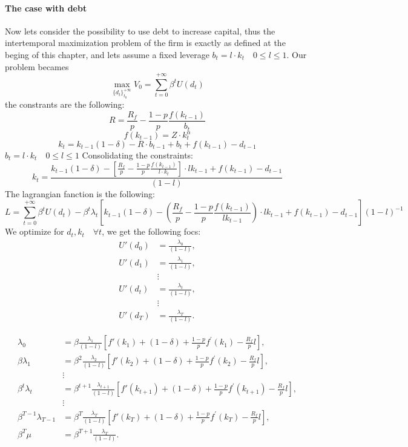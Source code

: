 \documentclass[12pt]{article}
\begin{document}
\paragraph{The case with debt}
Now lets consider the possibility to use debt to increase capital, thus the intertemporal maximization problem of the
firm is exactly as defined at the beging of this chapter, and lets assume a fixed leverage \(b_t = l \cdot k_t \quad 0
\leq l \leq 1\).
Our problem becames 
\[\max_{{\{d_{t}\}}^{+\infty}_{t_0}}V_0 = \sum_{t=0}^{+\infty}{\beta^t U(d_t)}\]
the constrants are the following:
\[R=\frac{R_f}{p}  -\frac{ 1-p }{ p }\frac{f(k_{t-1})}{b_t}\]
\[f(k_{t-1}) = Z \cdot k_t^\alpha\]
\[k_t = k_{t-1}(1 - \delta) - R \cdot b_{t-1} + b_{t} + f(k_{t-1}) - d_{t-1}\]
\(b_t = l \cdot k_t \quad 0
\leq l \leq 1\)
Consolidating the constraints:
\[k_t = \frac{k_{t-1}(1 - \delta) - \left[\frac{R_f}{p}  -\frac{ 1-p }{ p }\frac{f(k_{t-1})}{l \cdot k_t}\right] \cdot l k_{t-1} 
+ f(k_{t-1}) - d_{t-1}}{\left(1-l\right)}\]
The lagrangian fanction is the following:
\[L=\sum_{t=0}^{+\infty}\beta^t U(d_t) - \beta^t \lambda_t\left[k_{t-1}(1 - \delta) - \left(\frac{R_f}{p}  -\frac{ 1-p }{ p }
\frac{f(k_{t-1})}{l k_{t-1}}\right) \cdot l k_{t-1} 
+ f(k_{t-1}) - d_{t-1}\right]{\left(1-l\right)}^{-1}\]
We optimize for \(d_t,k_t
\quad \forall t\), we get the following  focs:
\begin{equation}
    \begin{aligned}
    U'(d_0) &= \frac{\lambda_0}{\left(1-l\right)} , \\
    U'(d_1) &= \frac{\lambda_1}{\left(1-l\right)}, \\
    & \vdots \\
    U'(d_{t}) &= \frac{\lambda_t}{\left(1-l\right)}, \\
    & \vdots \\
    U'(d_{T}) &= \frac{\lambda_T}{\left(1-l\right)}.
    \end{aligned}
\end{equation}

\begin{equation}
    \begin{aligned}
        \lambda_0 &= \beta \frac{\lambda_1}{\left(1-l\right)} \left[ f'(k_1) + (1 - \delta) + \frac{ 1-p }{ p } f^{\prime}(k_{1}) - \frac{R_f}{p}l \right], \\
        \beta \lambda_1 &= \beta^2 \frac{\lambda_2}{\left(1-l\right)} \left[ f'(k_2) + (1 - \delta) + \frac{ 1-p }{ p } f^{\prime}(k_{2}) - \frac{R_f}{p}l\right],\\
        & \vdots \\
        \beta^t \lambda_t &= \beta^{t+1} \frac{\lambda_{t+1}}{\left(1-l\right)} \left[ f'(k_{t+1}) + (1 - \delta) + \frac{ 1-p }{ p } f^{\prime}(k_{t+1}) - \frac{R_f}{p}l\right],\\
        & \vdots \\
        \beta^{T-1} \lambda_{T-1} &= \beta^T \frac{\lambda_{T}}{\left(1-l\right)} \left[ f'(k_T) + (1 - \delta) + \frac{ 1-p }{ p } f^{\prime}(k_{T}) - \frac{R_f}{p}l\right], \\
        \beta^T \mu &= \beta^{T+1} \frac{\lambda_{T}}{\left(1-l\right)}.
    \end{aligned}
\end{equation}
\end{document}
